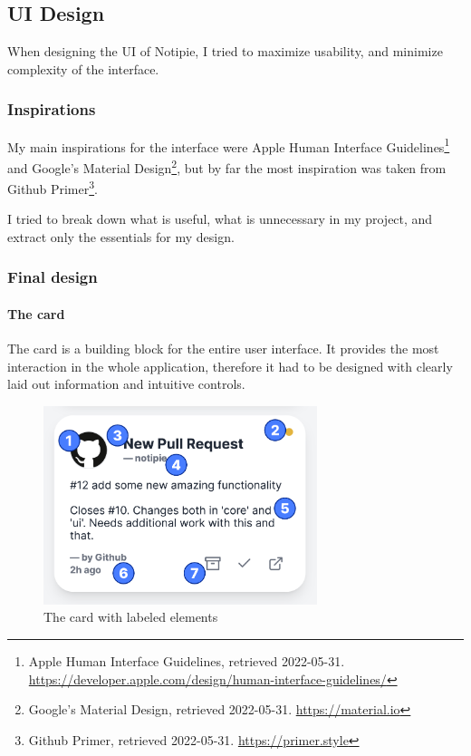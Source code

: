 \hypertarget{ui-design}{%
	\subsection{UI Design}\label{ui-design}}

When designing the UI of Notipie, I tried to maximize usability, and
minimize complexity of the interface.

\hypertarget{inspirations}{%
	\subsubsection{Inspirations}\label{inspirations}}

My main inspirations for the interface were Apple Human Interface
Guidelines\footnote{Apple Human Interface Guidelines, retrieved
	2022-05-31.
	\url{https://developer.apple.com/design/human-interface-guidelines/}}
and Google's Material Design\footnote{Google's Material Design,
	retrieved 2022-05-31. \url{https://material.io}}, but by far the most
inspiration was taken from Github Primer\footnote{Github Primer,
	retrieved 2022-05-31. \url{https://primer.style}}.

I tried to break down what is useful, what is unnecessary in my project,
and extract only the essentials for my design.

\hypertarget{final-design}{%
	\subsubsection{Final design}\label{final-design}}

\hypertarget{the-card}{%
	\paragraph{The card}\label{the-card}}

The card is a building block for the entire user interface. It provides
the most interaction in the whole application, therefore it had to be
designed with clearly laid out information and intuitive controls.

\begin{figure}
	\centering
	\includegraphics[width=8cm,height=\textheight]{./img/card_labeled.png}
	\caption{The card with labeled elements}
\end{figure}

